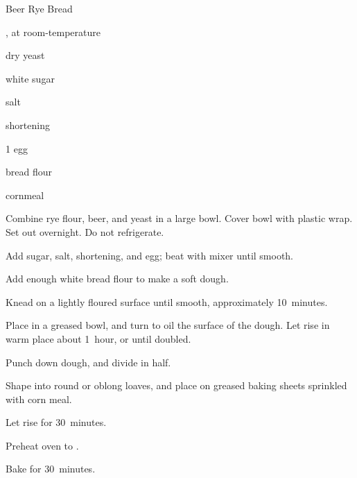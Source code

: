 \begin{recipe}{Beer Rye Bread}{}{}

\begin{ingredients}
\item {} 
\item \C{1\half} , at room-temperature 
\item \tp{4\half} dry yeast
\item {} white sugar
\item {} salt
\item {} shortening
\item 1 egg
\item {} bread flour
\item {} cornmeal
\end{ingredients}

\begin{directions}
\item Combine rye flour, beer, and yeast in a large bowl. Cover bowl with plastic wrap. Set out overnight. Do not refrigerate.
\item Add sugar, salt, shortening, and egg; beat with mixer until smooth.
\item Add enough white bread flour to make a soft dough.
\item Knead on a lightly floured surface until smooth, approximately 10~minutes.
\item Place in a greased bowl, and turn to oil the surface of the dough. Let rise in warm place about 1~hour, or until doubled.
\item Punch down dough, and divide in half.
\item Shape into round or oblong loaves, and place on greased baking sheets sprinkled with corn meal.
\item Let rise for 30~minutes.
\item Preheat oven to .
\item Bake for 30~minutes.
\end{directions}

\end{recipe}
